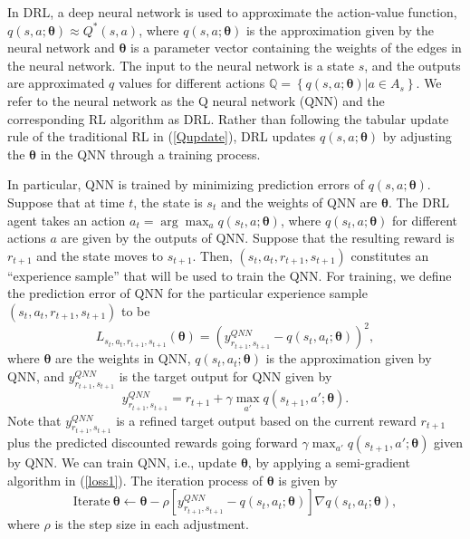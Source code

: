 \documentclass[journal,comsoc]{IEEEtran}
\begin{document}
In DRL, a deep neural network \cite{lecun2015deep} is used to approximate the action-value function,  $q\left( {s,a;{\bm{\theta }}} \right) \approx {Q^*}\left( {s,a} \right)$, where $q\left( {s,a;{\bm{\theta }}} \right)$  is the approximation given by the neural network and $ \bm{\theta } $  is a parameter vector containing the weights of the edges in the neural network. The input to the neural network is a state  $ s $, and the outputs are approximated  $ q $ values for different actions   $ \mathbb{Q}= \left\{ {q\left( {s,a;{\bm{\theta }}} \right)|a \in {A_s}} \right\}$. We refer to the neural network as the Q neural network (QNN) and the corresponding RL algorithm as DRL. Rather than following the tabular update rule of the traditional RL in (\ref{Qupdate}), DRL updates  $q\left( {s,a;{\bm{\theta }}} \right)$  by adjusting the $ \bm{\theta } $  in the QNN through a training process.


In particular, QNN is trained by minimizing prediction errors of  $q\left( {s,a;{\bm{\theta }}} \right)$. Suppose that at time  $ t $, the state is  $ s_t $  and the weights of QNN are $ \bm{\theta } $. The DRL agent takes an action  ${a_t} = \arg {\max _a}q\left( {{s_t},a;{\bm{\theta }}} \right)$, where   $q\left( {s_t,a;{\bm{\theta }}} \right)$  for different actions  $ a $  are given by the outputs of QNN. Suppose that the resulting reward is  $ r_{t+1} $  and the state moves to   $ s_{t+1} $. Then, $\left( {{s_t},{a_t},{r_{t + 1}},{s_{t + 1}}} \right)$  constitutes an ``experience sample'' that will be used to train the QNN.  For training, we define the prediction error of QNN for the particular experience sample  $\left( {{s_t},{a_t},{r_{t + 1}},{s_{t + 1}}} \right)$  to be
\begin{equation}\label{loss1}
{L_{{s_t},{a_t},{r_{t + 1}},{s_{t + 1}}}}\left( {{\bm{\theta}}} \right) = {\left( {y_{{r_{t + 1}},{s_{t + 1}}}^{QNN} - q\left( {{s_t},{a_t};{\bm{\theta}}} \right)} \right)^2},
\end{equation}
where $ \bm{\theta } $ are the weights in QNN, $q\left( {s_t,a_t;{\bm{\theta }}} \right)$  is the approximation given by QNN, and  $y_{{r_{t + 1}},{s_{t + 1}}}^{QNN}$  is the target output for QNN given by 
\begin{equation}\label{yQNN1}
y_{{r_{t + 1}},{s_{t + 1}}}^{QNN} = {r_{t + 1}} + \gamma {\max _{a'}}q\left( {{s_{t + 1}},a';{\bm{\theta }}} \right).
\end{equation}
Note that  $y_{{r_{t + 1}},{s_{t + 1}}}^{QNN}$  is a refined target output based on the current reward $ r_{t+1} $  plus the predicted discounted rewards going forward  $\gamma {\max _{a'}}q\left( {{s_{t + 1}},a';{\bm{\theta }}} \right)$ given by QNN. We can train QNN, i.e., update $ \bm{\theta } $, by applying a semi-gradient algorithm \cite{sutton1998reinforcement} in (\ref{loss1}). The iteration process of $ \bm{\theta } $ is given by
\begin{equation}\label{theta_update1}
\text{Iterate} \ {\bm{\theta}} \leftarrow {\bm{\theta }} - \rho \left[ {y_{{r_{t + 1}},{s_{t + 1}}}^{QNN} - q\left( {{s_t},{a_t};{\bm{\theta}}} \right)} \right]\nabla q\left( {{s_t},{a_t};{\bm{\theta }}} \right),
\end{equation}
where  $\rho $ is the step size in each adjustment.
\end{document}
